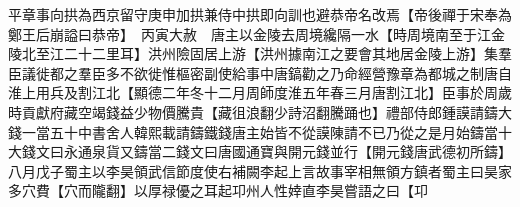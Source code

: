 平章事向拱為西京留守庚申加拱兼侍中拱即向訓也避恭帝名改焉【帝後禪于宋奉為鄭王后崩謚曰恭帝】　丙寅大赦　唐主以金陵去周境纔隔一水【時周境南至于江金陵北至江二十二里耳】洪州險固居上游【洪州據南江之要會其地居金陵上游】集羣臣議徙都之羣臣多不欲徙惟樞密副使給事中唐鎬勸之乃命經營豫章為都城之制唐自淮上用兵及割江北【顯德二年冬十二月周師度淮五年春三月唐割江北】臣事於周歲時貢獻府藏空竭錢益少物價騰貴【藏徂浪翻少詩沼翻騰踊也】禮部侍郎鍾謨請鑄大錢一當五十中書舍人韓熙載請鑄鐵錢唐主始皆不從謨陳請不已乃從之是月始鑄當十大錢文曰永通泉貨又鑄當二錢文曰唐國通寶與開元錢並行【開元錢唐武德初所鑄】　八月戊子蜀主以李昊領武信節度使右補闕李起上言故事宰相無領方鎮者蜀主曰昊家多穴費【穴而隴翻】以厚禄優之耳起卭州人性婞直李昊嘗語之曰【卭